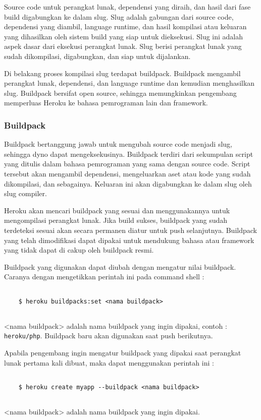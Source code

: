 Source code untuk perangkat lunak, dependensi yang diraih, dan hasil dari fase build digabungkan ke dalam slug. Slug adalah gabungan dari source code, dependensi yang diambil, language runtime, dan hasil kompilasi atau keluaran yang dihasilkan oleh sistem build yang siap untuk dieksekusi. Slug ini adalah aspek dasar dari eksekusi perangkat lunak. Slug berisi perangkat lunak yang sudah dikompilasi, digabungkan, dan siap untuk dijalankan.

Di belakang proses kompilasi slug terdapat buildpack. Buildpack mengambil perangkat lunak, dependensi, dan language runtime dan kemudian menghasilkan slug. Buildpack bersifat open source, sehingga memungkinkan pengembang memperluas Heroku ke bahasa pemrograman lain dan framework.

\subsubsection{Buildpack}
Buildpack bertanggung jawab untuk mengubah source code menjadi slug, sehingga dyno dapat mengeksekusinya. Buildpack terdiri dari sekumpulan script yang ditulis dalam bahasa pemrograman yang sama dengan source code. Script tersebut akan mengambil dependensi, mengeluarkan aset atau kode yang sudah dikompilasi, dan sebagainya. Keluaran ini akan digabungkan ke dalam slug oleh slug compiler.


Heroku akan mencari buildpack yang sesuai dan menggunakannya untuk mengompilasi perangkat lunak. Jika build sukses, buildpack yang sudah terdeteksi sesuai akan secara permanen diatur untuk push selanjutnya. Buildpack yang telah dimodifikasi dapat dipakai untuk mendukung bahasa atau framework yang tidak dapat di cakup oleh buildpack resmi.

Buildpack yang digunakan dapat diubah dengan mengatur nilai buildpack. Caranya dengan mengetikkan perintah ini pada command shell :
\begin{lstlisting}

	$ heroku buildpacks:set <nama buildpack>
	
\end{lstlisting}
<nama buildpack> adalah nama buildpack yang ingin dipakai, contoh : \texttt{heroku/php}. Buildpack baru akan digunakan saat push berikutnya. 

Apabila pengembang ingin mengatur buildpack yang dipakai saat perangkat lunak pertama kali dibuat, maka dapat menggunakan perintah ini :
\begin{lstlisting}

	$ heroku create myapp --buildpack <nama buildpack>
	
\end{lstlisting}
<nama buildpack> adalah nama buildpack yang ingin dipakai.

